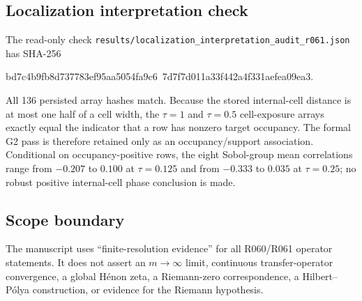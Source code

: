\subsection{Localization interpretation check}

The read-only check
\texttt{results/localization\_interpretation\_audit\_r061.json} has SHA-256
\begin{center}
\ttfamily\small
bd7c4b9fb8d737783ef95aa5054fa9c6\
7d7f7d011a33f442a4f331aefea09ea3.
\end{center}
All 136 persisted array hashes match.  Because the stored internal-cell
distance is at most one half of a cell width, the $\tau=1$ and $\tau=0.5$
cell-exposure arrays exactly equal the indicator that a row has nonzero target
occupancy.  The formal G2 pass is therefore retained only as an
occupancy/support association.  Conditional on occupancy-positive rows, the
eight Sobol-group mean correlations range from $-0.207$ to $0.100$ at
$\tau=0.125$ and from $-0.333$ to $0.035$ at $\tau=0.25$; no robust positive
internal-cell phase conclusion is made.

\subsection{Scope boundary}

The manuscript uses ``finite-resolution evidence'' for all R060/R061
operator statements.  It does not assert an $m\to\infty$ limit, continuous
transfer-operator convergence, a global H\'enon zeta, a Riemann-zero
correspondence, a Hilbert--P\'olya construction, or evidence for the Riemann
hypothesis.
